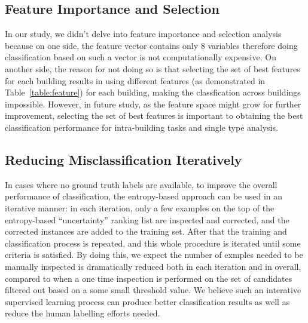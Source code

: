 \subsection{Feature Importance and Selection}
In our study, we didn't delve into feature importance and selection analysis because on one side, the feature vector contains only 8 variables therefore doing classification based on 
such a vector is not computationally expensive. On another side, the reason for not doing so is that selecting the set of best features for each building results in using different features 
(as demonstrated in Table~\ref{table:feature}) for each building, making the classfication across buildings impossible. However, in future study, as the feature space might grow for further
improvement, selecting the set of best features is important to obtaining the best classification performance for intra-building tasks and single type analysis.

\subsection{Reducing Misclassification Iteratively}
In cases where no ground truth labels are available, to improve the overall performance of classification, the entropy-based approach can be used in an iterative manner: in each iteration, 
only a few examples on the top of the entropy-based ``uncertainty'' ranking list are inspected and corrected, and the corrected instances are added to the training set. After that the training 
and classification process is repeated, and this whole procedure is iterated until some criteria is satisfied. By doing this, we expect the number of exmples needed to be manually inspected 
is dramatically reduced both in each iteration and in overall, compared to when a one time inspection is performed on the set of candidates filtered out based on a some small threshold value.
We believe such an interative supervised learning process can produce better classification results as well as reduce the human labelling efforts needed.
